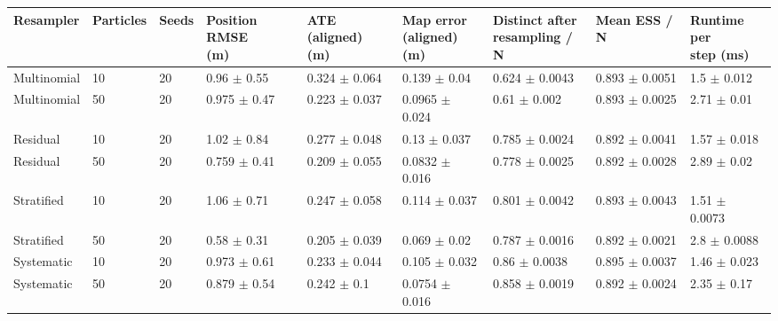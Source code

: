 \begin{tabular}{lllllllll}
\toprule
Resampler & Particles & Seeds & \shortstack[l]{Position RMSE\\(m)} & \shortstack[l]{ATE (aligned)\\(m)} & \shortstack[l]{Map error\\(aligned) (m)} & \shortstack[l]{Distinct after\\resampling / N} & Mean ESS / N & \shortstack[l]{Runtime per\\step (ms)} \\
\midrule
Multinomial & 10 & 20 & 0.96 $\pm$ 0.55 & 0.324 $\pm$ 0.064 & 0.139 $\pm$ 0.04 & 0.624 $\pm$ 0.0043 & 0.893 $\pm$ 0.0051 & 1.5 $\pm$ 0.012 \\
Multinomial & 50 & 20 & 0.975 $\pm$ 0.47 & 0.223 $\pm$ 0.037 & 0.0965 $\pm$ 0.024 & 0.61 $\pm$ 0.002 & 0.893 $\pm$ 0.0025 & 2.71 $\pm$ 0.01 \\
Residual & 10 & 20 & 1.02 $\pm$ 0.84 & 0.277 $\pm$ 0.048 & 0.13 $\pm$ 0.037 & 0.785 $\pm$ 0.0024 & 0.892 $\pm$ 0.0041 & 1.57 $\pm$ 0.018 \\
Residual & 50 & 20 & 0.759 $\pm$ 0.41 & 0.209 $\pm$ 0.055 & 0.0832 $\pm$ 0.016 & 0.778 $\pm$ 0.0025 & 0.892 $\pm$ 0.0028 & 2.89 $\pm$ 0.02 \\
Stratified & 10 & 20 & 1.06 $\pm$ 0.71 & 0.247 $\pm$ 0.058 & 0.114 $\pm$ 0.037 & 0.801 $\pm$ 0.0042 & 0.893 $\pm$ 0.0043 & 1.51 $\pm$ 0.0073 \\
Stratified & 50 & 20 & 0.58 $\pm$ 0.31 & 0.205 $\pm$ 0.039 & 0.069 $\pm$ 0.02 & 0.787 $\pm$ 0.0016 & 0.892 $\pm$ 0.0021 & 2.8 $\pm$ 0.0088 \\
Systematic & 10 & 20 & 0.973 $\pm$ 0.61 & 0.233 $\pm$ 0.044 & 0.105 $\pm$ 0.032 & 0.86 $\pm$ 0.0038 & 0.895 $\pm$ 0.0037 & 1.46 $\pm$ 0.023 \\
Systematic & 50 & 20 & 0.879 $\pm$ 0.54 & 0.242 $\pm$ 0.1 & 0.0754 $\pm$ 0.016 & 0.858 $\pm$ 0.0019 & 0.892 $\pm$ 0.0024 & 2.35 $\pm$ 0.17 \\
\bottomrule
\end{tabular}
